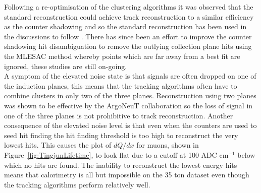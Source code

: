 Following a re-optimisation of the clustering algorithms it was observed that the standard reconstruction could achieve track reconstruction to a similar efficiency as the counter shadowing and so the standard reconstruction has been used in the discussions to follow \citep{TingjunClustering}. There has since been an effort to improve the counter shadowing hit disambiguation to remove the outlying collection plane hits using the MLESAC method \citep{MLESAC} whereby points which are far away from a best fit are ignored, these studies are still on-going.\\

A symptom of the elevated noise state is that signals are often dropped on one of the induction planes, this means that the tracking algorithms often have to combine clusters in only two of the three planes. Reconstruction using two planes was shown to be effective by the ArgoNeuT collaboration \citep{ArgoNeuT} so the loss of signal in one of the three planes is not prohibitive to track reconstruction. Another consequence of the elevated noise level is that even when the counters are used to seed hit finding the hit finding threshold is too high to reconstruct the very lowest hits. This causes the plot of $dQ/dx$ for muons, shown in Figure~\ref{fig:TingjunLifetime}, to look flat due to a cutoff at 100 ADC cm$^{-1}$ below which no hits are found. The inability to reconstruct the lowest energy hits means that calorimetry is all but impossible on the 35 ton dataset even though the tracking algorithms perform relatively well. \\

